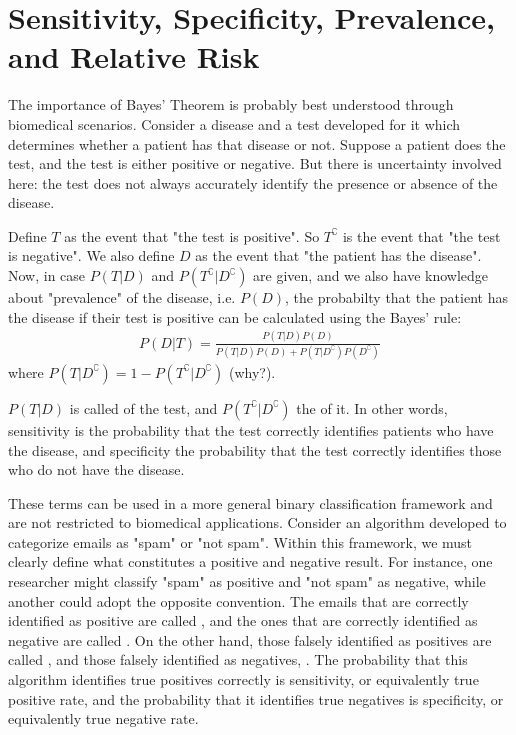 \section{Sensitivity, Specificity, Prevalence, and Relative Risk}

The importance of Bayes' Theorem is probably best understood through biomedical scenarios.
Consider a disease and a test developed for it which determines whether a patient has that disease or not.
Suppose a patient does the test, and the test is either positive or negative.
But there is uncertainty involved here:
the test does not always accurately identify the presence or absence of the disease.

Define \( T \) as the event that "the test is positive".
So \( T^\complement \) is the event that "the test is negative".
We also define \( D \) as the event that "the patient has the disease".
Now, in case \( P(T | D) \) and \( P(T^\complement | D^\complement) \) are given, and we also have knowledge about "prevalence" of the disease, i.e. \( P(D) \),
the probabilty that the patient has the disease if their test is positive can be calculated using the Bayes' rule:
\begin{gather*}
	P(D | T) = \frac{P(T | D)P(D)}{P(T | D)P(D) + P(T | D^\complement)P(D^\complement)}
\end{gather*}
where \( P(T | D^\complement) = 1 - P(T^\complement | D^\complement) \) (why?).

\( P(T | D) \) is called  of the test, and \( P(T^\complement | D^\complement) \) the  of it.
In other words, sensitivity is the probability that the test correctly identifies patients who have the disease,
and specificity the probability that the test correctly identifies those who do not have the disease.

These terms can be used in a more general binary classification framework and are not restricted to biomedical applications.
Consider an algorithm developed to categorize emails as "spam" or "not spam".
Within this framework, we must clearly define what constitutes a positive and negative result.
For instance, one researcher might classify "spam" as positive and "not spam" as negative, while another could adopt the opposite convention.
The emails that are correctly identified as positive are called ,
and the ones that are correctly identified as negative are called .
On the other hand, those falsely identified as positives are called ,
and those falsely identified as negatives, .
The probability that this algorithm identifies true positives correctly is sensitivity, or equivalently true positive rate,
and the probability that it identifies true negatives is specificity, or equivalently true negative rate.

